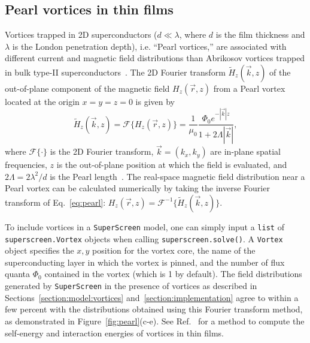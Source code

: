 \documentclass[final,3p,times,twocolumn]{elsarticle}
\newcommand{\inline}[1]{\texttt{#1}\xspace}
\newcommand{\SuperScreen}{\inline{SuperScreen}}
\begin{document}
\subsection{Pearl vortices in thin films}
\label{section:examples:pearl-vortices}
Vortices trapped in 2D superconductors ($d\ll\lambda$, where $d$ is the film thickness and $\lambda$ is the London penetration depth), i.e. ``Pearl vortices,'' are associated with different current and magnetic field distributions than Abrikosov vortices trapped in bulk type-II superconductors~\cite{Pearl1964-cl}. The 2D Fourier transform $\tilde{H}_z(\vec{k}, z)$ of the out-of-plane component of the magnetic field $H_z(\vec{r}, z)$ from a Pearl vortex located at the origin $x=y=z=0$ is given by
\begin{equation}
    \tilde{H}_z(\vec{k}, z)=\mathcal{F}\{H_z(\vec{r}, z)\}=\frac{1}{\mu_0}\frac{\Phi_0e^{-|\vec{k}|z}}{1+2\Lambda|\vec{k}|},
    \label{eq:pearl}
\end{equation}
where $\mathcal{F}\{\cdot\}$ is the 2D Fourier transform, $\vec{k}=(k_x, k_y)$ are in-plane spatial frequencies, $z$ is the out-of-plane position at which the field is evaluated, and $2\Lambda = 2\lambda^2 / d$ is the Pearl length~\cite{Pearl1964-cl, Tafuri2004-ap}. The real-space magnetic field distribution near a Pearl vortex can be calculated numerically by taking the inverse Fourier transform of Eq.~\ref{eq:pearl}: $H_z(\vec{r}, z)=\mathcal{F}^{-1}\{\tilde{H}_z(\vec{k}, z)\}$.

To include vortices in a \SuperScreen model, one can simply input a \inline{list} of \inline{superscreen.Vortex} objects when calling \inline{superscreen.solve()}. A \inline{Vortex} object specifies the $x,y$ position for the vortex core, the name of the superconducting layer in which the vortex is pinned, and the number of flux quanta $\Phi_0$ contained in the vortex (which is 1 by default). The field distributions generated by \SuperScreen in the presence of vortices as described in Sections~\ref{section:model:vortices} and~\ref{section:implementation} agree to within a few percent with the distributions obtained using this Fourier transform method, as demonstrated in Figure~\ref{fig:pearl}(c-e). See Ref.~\cite{Brandt2005-wj} for a method to compute the self-energy and interaction energies of vortices in thin films.
\end{document}
